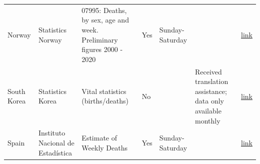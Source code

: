 \documentclass[
]{article}
\begin{document}
\begin{landscape}
\begin{table}[]
\begin{tabular}{p{.5in}p{1.5in}p{2in}p{1in}p{1.5in}p{1in}p{.5in}}
Norway           & Statistics Norway                                                                                                                                                    & 07995: Deaths, by sex, age and week. Preliminary figures 2000 - 2020                                                                                                       & Yes               & Sunday-Saturday                                          &                                                                          & \href{https://www.ssb.no/en/statbank/table/07995/}{link}                                                                                                                                                                                                                                                                                   \\
South Korea      & Statistics Korea                                                                                                                                                     & Vital statistics (births/deaths)                                                                                                                                           & No                &                                                          & Received translation assistance; data only available monthly & \href{http://kosis.kr/statisticsList/statisticsListIndex.do?menuId=M\_01\_01\&vwcd=MT\_ZTITLE\&parmTabId=M\_01\_01\#SelectStatsBoxDiv}{link}                                                                                                                                                                                               \\
Spain            & Instituto Nacional de Estadística                                                                                                                                    & Estimate of Weekly Deaths                                                                                                                                                  & Yes               & Sunday-Saturday                                          &                                                                          & \href{https://www.ine.es/en/experimental/defunciones/experimental_defunciones.htm}{link}                                                                                                                                                                                                                                                                       \\

\end{tabular}
\end{table}
\end{landscape}
\end{document}
